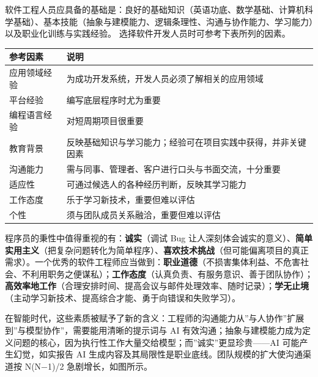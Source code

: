 \documentclass[
]{ctexbook}
\newcounter{none}
\begin{document}
软件工程人员应具备的基础是：良好的基础知识（英语功底、数学基础、计算机科学基础）、基本技能（抽象与建模能力、逻辑条理性、沟通与协作能力、学习能力）以及职业化训练与实践经验。
选择软件开发人员时可参考下表所列的因素。

{\def\LTcaptype{none} %
\begin{longtable}[]{@{}
  >{\raggedright\arraybackslash}p{}
  >{\raggedright\arraybackslash}p{}@{}}
\toprule\noalign{}
\begin{minipage}[b]{\linewidth}\raggedright
参考因素
\end{minipage} & \begin{minipage}[b]{\linewidth}\raggedright
说明
\end{minipage} \\
\midrule\noalign{}
\endhead
\bottomrule\noalign{}
\endlastfoot
应用领域经验 & 为成功开发系统，开发人员必须了解相关的应用领域 \\
平台经验 & 编写底层程序时尤为重要 \\
编程语言经验 & 对短周期项目很重要 \\
教育背景 &
反映基础知识与学习能力；经验可在项目实践中获得，并非关键因素 \\
沟通能力 & 需与同事、管理者、客户进行口头与书面交流，十分重要 \\
适应性 & 可通过候选人的各种经历判断，反映其学习能力 \\
工作态度 & 乐于学习新技术，重要但难以评估 \\
个性 & 须与团队成员关系融洽，重要但难以评估 \\
\end{longtable}
}

程序员的秉性中值得重视的有：\textbf{诚实}（调试 Bug
让人深刻体会诚实的意义）、\textbf{简单实用主义}（把复杂问题转化为简单程序）、\textbf{喜欢技术挑战}（但可能偏离项目的真正需求）。一个优秀的软件工程师应当做到：\textbf{职业道德}（不损害集体利益、不危害社会、不利用职务之便谋私）；\textbf{工作态度}（认真负责、有服务意识、善于团队协作）；\textbf{高效率地工作}（合理安排时间、提高会议与邮件处理效率、随时记录）；\textbf{学无止境}（主动学习新技术、提高综合才能、勇于向错误和失败学习）。

在智能时代，这些素质被赋予了新的含义：工程师的沟通能力从''与人协作''扩展到''与模型协作''，需要能用清晰的提示词与
AI
有效沟通；抽象与建模能力成为定义问题的核心，因为执行性工作大量交给模型；而''诚实''更显珍贵------AI
可能产生幻觉，如实报告 AI
生成内容及其局限性是职业底线。团队规模的扩大使沟通渠道按 N(N−1)/2
急剧增长，如图所示。
\end{document}
